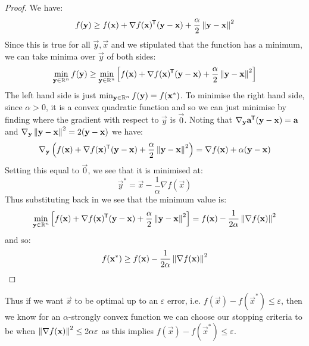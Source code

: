 \documentclass[../main.tex]{subfiles}
\begin{document}
\begin{proof}
  We have:
  \[
    f(\mathbf{\bm{y}}) \geq f(\mathbf{\bm{x}}) + \nabla f(\mathbf{\bm{x}})^{{\mkern-1.5mu\mathsf{T}}}(\mathbf{\bm{y}}  - \mathbf{\bm{x}}) + \frac{\alpha}{2} \left\lVert \mathbf{\bm{y}} - \mathbf{\bm{x}} \right\rVert^2
  \]
  Since this is true for all $\vec{y}, \vec{x}$ and we stipulated that the function has a minimum, we can take minima over $\vec{y}$ of both sides:
  \[
    \min_{\mathbf{\bm{y}} \in \mathbb{R}^{n}} f(\mathbf{\bm{y}}) \geq \min_{\mathbf{\bm{y}} \in \mathbb{R}^{n}} \left[f(\mathbf{\bm{x}}) + \nabla f(\mathbf{\bm{x}})^{{\mkern-1.5mu\mathsf{T}}}(\mathbf{\bm{y}}  - \mathbf{\bm{x}}) + \frac{\alpha}{2} \left\lVert \mathbf{\bm{y}} - \mathbf{\bm{x}} \right\rVert^2\right]
  \]
  The left hand side is just $\min_{\mathbf{\bm{y}} \in \mathbb{R}^{n}} f(\mathbf{\bm{y}}) = f(\mathbf{\bm{x}}^{*})$.
  To minimise the right hand side, since $\alpha > 0$, it is a convex quadratic function and so we can just minimise by finding where the gradient with respect to $\vec{y}$ is $\vec{0}$.
  Noting that $\nabla_{\mathbf{\bm{y}}} \mathbf{\bm{a}}^{{\mkern-1.5mu\mathsf{T}}} (\mathbf{\bm{y}} - \mathbf{\bm{x}}) = \mathbf{\bm{a}}$ and $\nabla_{\mathbf{\bm{y}}} \left\lVert \mathbf{\bm{y}} - \mathbf{\bm{x}} \right\rVert^2 = 2 (\mathbf{\bm{y}} - \mathbf{\bm{x}})$ we have:
  \[
    \nabla_{\mathbf{\bm{y}}} \left(f(\mathbf{\bm{x}}) + \nabla f(\mathbf{\bm{x}})^{{\mkern-1.5mu\mathsf{T}}}(\mathbf{\bm{y}} - \mathbf{\bm{x}}) + \frac{\alpha}{2}\left\lVert \mathbf{\bm{y}} - \mathbf{\bm{x}} \right\rVert^2\right) = \nabla f(\mathbf{\bm{x}}) + \alpha(\mathbf{\bm{y}} - \mathbf{\bm{x}})
  \]
  Setting this equal to $\vec{0}$, we see that it is minimised at:
  \[
    \vec{y}^{*} = \vec{x} - \frac{1}{\alpha} \nabla f(\vec{x})
  \]
  Thus substituting back in we see that the minimum value is:
  \begin{align*}
    \min_{\mathbf{\bm{y}} \in \mathbb{R}^{n}} \left[f(\mathbf{\bm{x}}) + \nabla f(\mathbf{\bm{x}})^{{\mkern-1.5mu\mathsf{T}}}(\mathbf{\bm{y}}  - \mathbf{\bm{x}}) + \frac{\alpha}{2} \left\lVert \mathbf{\bm{y}} - \mathbf{\bm{x}} \right\rVert^2\right] = f(\mathbf{\bm{x}}) - \frac{1}{2\alpha}\left\lVert \nabla f(\mathbf{\bm{x}}) \right\rVert^2
  \end{align*}
  and so:
  \[
    f(\mathbf{\bm{x}}^{*}) \geq f(\mathbf{\bm{x}}) - \frac{1}{2\alpha}\left\lVert \nabla f(\mathbf{\bm{x}}) \right\rVert^2
  \]
\end{proof}
Thus if we want $\vec{x}$ to be optimal up to an $\varepsilon$ error, i.e. $f(\vec{x}) - f(\vec{x}^{*}) \leq \varepsilon$, then we know for an $\alpha$-strongly convex function we can choose our stopping criteria to be when $\left\lVert \nabla f(\mathbf{\bm{x}}) \right\rVert^2 \leq 2\alpha \varepsilon$ as this implies $f(\vec{x}) - f(\vec{x}^{*}) \leq \varepsilon$.
\end{document}
